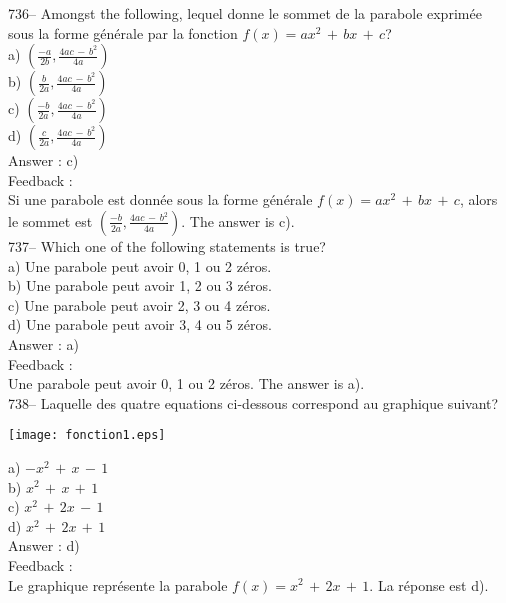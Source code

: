﻿\documentclass[letterpaper, 12pt]{article}
\begin{document}
736-- Amongst the following, lequel donne le sommet de la parabole
exprim\'ee sous la forme g\'en\'erale par la fonction
$f(x)=ax^{2}\,+\,bx\,+\,c$?\\
a) $(\frac{-a}{2b},\frac{4ac\,-\,b^{2}}{4a})$\\[2mm]
b) $(\frac{b}{2a},\frac{4ac\,-\,b^{2}}{4a})$\\[2mm]
c) $(\frac{-b}{2a},\frac{4ac\,-\,b^{2}}{4a})$\\[2mm]
d) $(\frac{c}{2a},\frac{4ac\,-\,b^{2}}{4a})$\\

Answer : c)\\

Feedback : \\
Si une parabole est donn\'ee sous la forme g\'en\'erale
$f(x)=ax^{2}\,+\,bx\,+\,c$, alors le sommet est
$(\frac{-b}{2a},\frac{4ac\,-\,b^{2}}{4a})$.  The answer is c).\\

737-- Which one of the following statements is true?\\
a) Une parabole peut avoir 0, 1 ou 2 z\'eros.\\
b) Une parabole peut avoir 1, 2 ou 3 z\'eros.\\
c) Une parabole peut avoir 2, 3 ou 4 z\'eros.\\
d) Une parabole peut avoir 3, 4 ou 5 z\'eros.\\

Answer : a)\\

Feedback : \\
Une parabole peut avoir 0, 1 ou 2 z\'eros.  The answer is a).\\

738-- Laquelle des quatre equations ci-dessous correspond au graphique
suivant?\\
    \begin{center}
    \texttt{[image: fonction1.eps]}
    \end{center}

a) $-x^{2}\,+\,x\,-\,1$\\
b) $x^{2}\,+\,x\,+\,1$\\
c) $x^{2}\,+\,2x\,-\,1$\\
d) $x^{2}\,+\,2x\,+\,1$\\

Answer : d)\\

Feedback : \\
Le graphique repr\'esente la parabole $f(x)=x^{2}\,+\,2x\,+\,1$.  La
r\'eponse est d).\\
\end{document}
